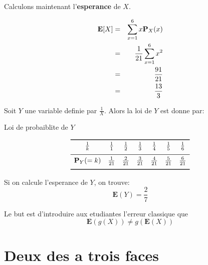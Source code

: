 \documentclass[a4paper]{tufte-handout}
\begin{document}
Calculons maintenant l'\textbf{esperance} de $X$.

\begin{eqnarray*}
  \mathbf{E}[X] &=& \sum_{x=1}^6 x\P_X(x)\\
                &=& \frac{1}{21} \sum_{x=1}^6 x^2\\
                &=& \frac{91}{21}\\
                &=& \frac{13}{3}
\end{eqnarray*}

Soit $Y$ une variable definie par $\frac{1}{X}$. Alors la loi de $Y$ est donne
par:

\begin{table}[htpb]
  \centering
  \caption{Loi de probaiblite de $Y$}
  \label{tab:label}
  $$
  \begin{array}{ccccccc}
    \toprule
    \frac{1}{k} & \frac{1}{1} & \frac{1}{2} & \frac{1}{3} & \frac{1}{4} &
    \frac{1}{5} & \frac{1}{6}\\[4pt]
    \midrule
    \P_Y(=k) & \frac{1}{21}& \frac{2}{21} & \frac{3}{21} & \frac{4}{21} &
    \frac{5}{21} & \frac{6}{21}\\[4pt]
    \bottomrule
  \end{array}
  $$
\end{table}

Si on calcule l'esperance de $Y$, on trouve:
\begin{equation}
  \mathbf{E}(Y) = \frac{2}{7}
\end{equation}

Le but est d'introduire aux etudiantes l'erreur classique que 
$$
\mathbf{E}\left(g\left(X\right)\right)  \neq g(\mathbf{E}\left(X\right))
$$


\section{Deux des a trois faces}
\end{document}

